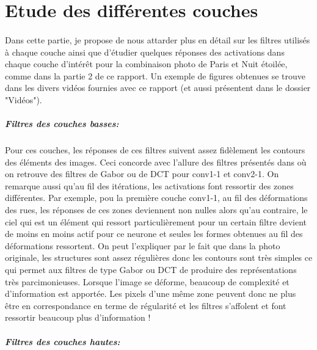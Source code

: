 \documentclass{article}
\begin{document}
\section{Etude des différentes couches}
\paragraph*{}
Dans cette partie, je propose de nous attarder plus en détail sur les filtres utilisés à chaque couche ainsi que d'étudier quelques réponses des activations dans chaque couche d'intérêt pour la combinaison photo de Paris et Nuit étoilée, comme dans la partie 2 de ce rapport. Un exemple de figures obtenues se trouve dans les divers vidéos fournies avec ce rapport (et aussi présentent dans le dossier "Vidéos").
\subparagraph*{Filtres des couches basses:} 
Pour ces couches, les réponses de ces filtres suivent assez fidèlement les contours des éléments des images. Ceci concorde avec l'allure des filtres présentés dans \cite{DBLP:journals/corr/ZeilerF13} où on retrouve des filtres de Gabor ou de DCT pour conv1-1 et conv2-1. On remarque aussi qu'au fil des itérations, les activations font ressortir des zones différentes. Par exemple, pou la première couche conv1-1, au fil des déformations des rues, les réponses de ces zones deviennent non nulles alors qu'au contraire, le ciel qui est un élément qui ressort particulièrement pour un certain filtre devient de moins en moins actif pour ce neurone et seules les formes obtenues au fil des déformations ressortent. On peut l'expliquer par le fait que dans la photo originale, les structures sont assez régulières donc les contours sont très simples ce qui permet aux filtres de type Gabor ou DCT de produire des représentations très parcimonieuses. Lorsque l'image se déforme, beaucoup de complexité et d'information est apportée. Les pixels d'une même zone peuvent donc ne plus être en correspondance en terme de régularité et les filtres s'affolent et font ressortir beaucoup plus d'information !
\subparagraph*{Filtres des couches hautes:}
\end{document}
